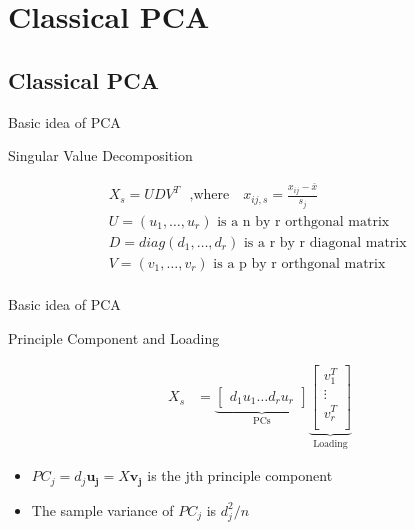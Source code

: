 \documentclass[ignorenonframetext,]{beamer}
\providecommand{\tightlist}{%
  \setlength{\itemsep}{0pt}\setlength{\parskip}{0pt}}
\begin{document}
\section{Classical PCA}\label{classical-pca}

\subsection{Classical PCA}\label{classical-pca-1}

\begin{frame}{Basic idea of PCA}

\begin{block}{Singular Value Decomposition}

\begin{gather*} 
  X_s = UDV^T \text{~~,where~~~} x_{ij,s} = \frac{x_{ij} - \bar{x}}{s_j} \\
  U = (u_1, \dots, u_r) \text {~is a n by r orthgonal matrix~} \\
  D = diag(d_1, \dots, d_r) \text {~is a r by r diagonal matrix~} \\
  V = (v_1, \dots, v_r) \text {~is a p by r orthgonal matrix~} \\
\end{gather*}

\end{block}

\end{frame}

\begin{frame}{Basic idea of PCA}

\begin{block}{Principle Component and Loading}

\begin{align*} 
  X_s &= \underbrace{\begin{bmatrix} d_1u_1 \hdots  d_ru_r \end{bmatrix} }_\text{PCs}
         \underbrace{\begin{bmatrix} v_1^T \\
                         \vdots \\
                         v_r^T \\
         \end{bmatrix}}_\text{Loading}
\end{align*}

\begin{itemize}
\tightlist
\item
  \(PC_j = d_j\pmb{u_j} = X\pmb{v_j}\) is the jth principle component
\item
  The sample variance of \(PC_j\) is \(d_j^2/n\)
\end{itemize}

\end{block}

\end{frame}
\end{document}

